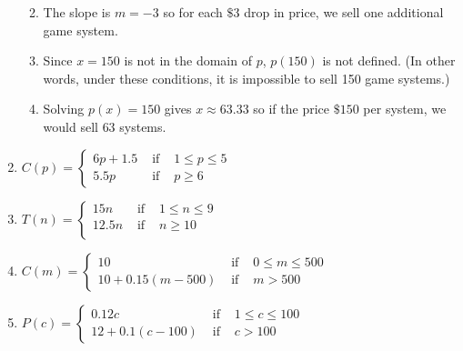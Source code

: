 \documentclass{ximera}
\begin{document}
\begin{enumerate}
\begin{enumerate}
\begin{center}
\end{center}



\item The slope is $m = -3$ so for each $\$3$ drop in price, we sell one additional game system.

\item   Since $x = 150$ is not in the domain of $p$, $p(150)$ is not defined.  (In other words, under these conditions, it is impossible to sell 150 game systems.)

\item Solving $p(x) = 150$ gives $x \approx 63.33$ so if the price  $\$150$ per system, we would sell $63$ systems.

\end{enumerate}



\item ${\displaystyle C(p) = \left\{ \begin{array}{rcl} 6p + 1.5 & \mbox{ if } & 1 \leq p \leq 5 \\
                                                            5.5p & \mbox{ if } & p\geq 6
                                     \end{array} \right. }$



\item  ${\displaystyle T(n) = \left\{ \begin{array}{rcl} 15n & \mbox{ if } & 1 \leq n \leq 9 \\
                                                            12.5n & \mbox{ if } & n \geq 10 \\
                                     \end{array} \right. }$


\item ${\displaystyle C(m) = \left\{ \begin{array}{rcl} 10 & \mbox{ if } & 0 \leq m \leq 500 \\
                                                            10+0.15(m-500) & \mbox{ if } & m > 500
                                     \end{array} \right. }$

\item ${\displaystyle P(c) = \left\{ \begin{array}{rcl} 0.12c & \mbox{ if } & 1 \leq c \leq 100 \\
                                                            12 + 0.1(c-100) & \mbox{ if } & c > 100
                                     \end{array} \right. }$


\end{enumerate}
\end{document}
